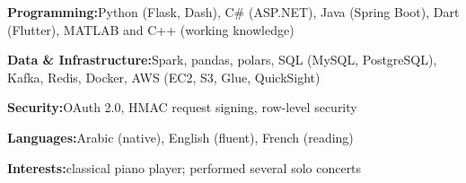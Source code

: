 {\begin{cvitems}
        \item {\textbf{Programming:}\atsspace Python (Flask, Dash), C\# (ASP.NET), Java (Spring Boot), Dart (Flutter), MATLAB and C++ (working knowledge)}
        \item {\textbf{Data \& Infrastructure:}\atsspace Spark, pandas, polars, SQL (MySQL, PostgreSQL), Kafka, Redis, Docker, AWS (EC2, S3, Glue, QuickSight)}
        \item {\textbf{Security:}\atsspace OAuth 2.0, HMAC request signing, row-level security}
        \item {\textbf{Languages:}\atsspace Arabic (native), English (fluent), French (reading)}
        \item {\textbf{Interests:}\atsspace classical piano player; performed several solo concerts}
      \end{cvitems}
    }


